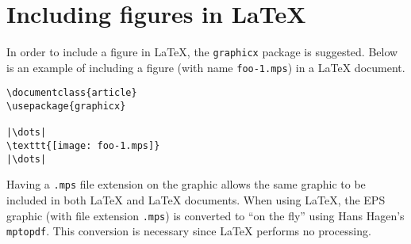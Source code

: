 \section{Including \MP{} figures in \LaTeX}
\label{sec:latexincl}

In order to include a \MP{} figure in \LaTeX{}, the \texttt{graphicx} package is suggested.  Below is an example of including a \MP{} figure (with name \texttt{foo-1.mps}) in a \LaTeX{} document.
\begin{lstlisting}[xleftmargin=17bp]
\documentclass{article}
\usepackage{graphicx}

|\dots|
\texttt{[image: foo-1.mps]}
|\dots|

\end{lstlisting}
Having a \verb|.mps| file extension on the graphic allows the same graphic to be included in both \LaTeX{} and \PDF\LaTeX{} documents.  When using \PDF\LaTeX, the EPS graphic (with file extension \verb|.mps|) is converted to \PDF{} ``on the fly'' using Hans Hagen's \texttt{mptopdf}.  This conversion is necessary since \PDF\LaTeX{} performs no \PS{} processing.
